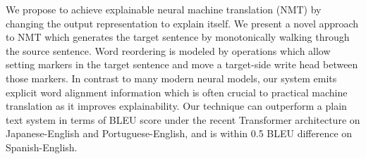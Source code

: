 We propose to achieve explainable neural machine translation (NMT) by changing the output representation to explain itself. We present a novel approach to NMT which generates the target sentence by monotonically walking through the source sentence. Word reordering is modeled by operations which allow setting markers in the target sentence and move a target-side write head between those markers. In contrast to many modern neural models, our system emits explicit word alignment information which is often crucial to practical machine translation as it improves explainability. Our technique can outperform a plain text system in terms of BLEU score under the recent Transformer architecture on Japanese-English and Portuguese-English, and is within 0.5 BLEU difference on Spanish-English.
